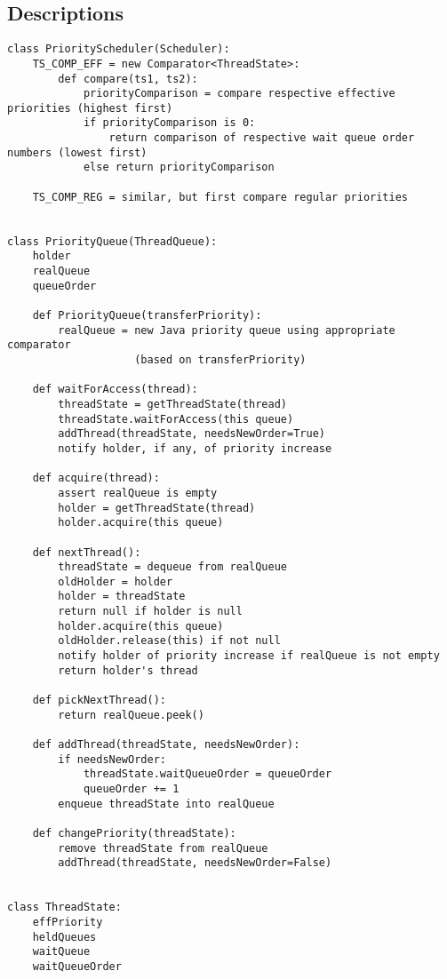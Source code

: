 \documentclass{article}
\begin{document}
\subsection{Descriptions} %
\scriptsize
\begin{lstlisting}
class PriorityScheduler(Scheduler):
    TS_COMP_EFF = new Comparator<ThreadState>:
        def compare(ts1, ts2):
            priorityComparison = compare respective effective priorities (highest first)
            if priorityComparison is 0:
                return comparison of respective wait queue order numbers (lowest first)
            else return priorityComparison

    TS_COMP_REG = similar, but first compare regular priorities


class PriorityQueue(ThreadQueue):
    holder
    realQueue
    queueOrder

    def PriorityQueue(transferPriority):
        realQueue = new Java priority queue using appropriate comparator
                    (based on transferPriority)

    def waitForAccess(thread):
        threadState = getThreadState(thread)
        threadState.waitForAccess(this queue)
        addThread(threadState, needsNewOrder=True)
        notify holder, if any, of priority increase

    def acquire(thread):
        assert realQueue is empty
        holder = getThreadState(thread)
        holder.acquire(this queue)

    def nextThread():
        threadState = dequeue from realQueue
        oldHolder = holder
        holder = threadState
        return null if holder is null
        holder.acquire(this queue)
        oldHolder.release(this) if not null
        notify holder of priority increase if realQueue is not empty
        return holder's thread

    def pickNextThread():
        return realQueue.peek()

    def addThread(threadState, needsNewOrder):
        if needsNewOrder:
            threadState.waitQueueOrder = queueOrder
            queueOrder += 1
        enqueue threadState into realQueue

    def changePriority(threadState):
        remove threadState from realQueue
        addThread(threadState, needsNewOrder=False)


class ThreadState:
    effPriority
    heldQueues
    waitQueue
    waitQueueOrder


\end{lstlisting}
\end{document}
